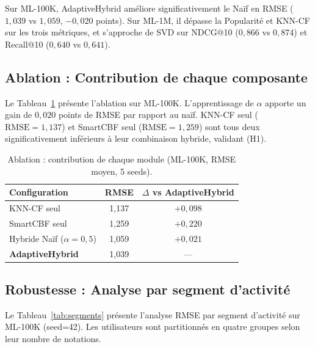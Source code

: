 \documentclass[conference]{IEEEtran}
\begin{document}
Sur ML-100K, AdaptiveHybrid améliore significativement le Naïf en RMSE
($1{,}039$ vs $1{,}059$, $-0{,}020$ points). Sur ML-1M, il dépasse la
Popularité et KNN-CF sur les trois métriques, et s'approche de SVD sur
NDCG@10 ($0{,}866$ vs $0{,}874$) et Recall@10 ($0{,}640$ vs $0{,}641$).

\subsection{Ablation : Contribution de chaque composante}

Le Tableau~\ref{tab:ablation} présente l'ablation sur ML-100K. L'apprentissage
de $\alpha$ apporte un gain de $0{,}020$ points de RMSE par rapport au naïf.
KNN-CF seul ($\text{RMSE}=1{,}137$) et SmartCBF seul ($\text{RMSE}=1{,}259$)
sont tous deux significativement inférieurs à leur combinaison hybride, validant
(H1).

\begin{table}[!t]
\renewcommand{\arraystretch}{1.2}
\caption{Ablation : contribution de chaque module (ML-100K, RMSE moyen, 5 seeds).}
\label{tab:ablation}
\centering
\begin{tabular}{@{}lcc@{}}
\toprule
\textbf{Configuration} & \textbf{RMSE} & \textbf{$\Delta$ vs AdaptiveHybrid} \\
\midrule
KNN-CF seul              & 1,137 & $+0{,}098$ \\
SmartCBF seul            & 1,259 & $+0{,}220$ \\
Hybride Naïf ($\alpha=0{,}5$) & 1,059 & $+0{,}021$ \\
\textbf{AdaptiveHybrid}  & 1,039 & --- \\
\bottomrule
\end{tabular}
\end{table}

\subsection{Robustesse : Analyse par segment d'activité}

Le Tableau~\ref{tab:segments} présente l'analyse RMSE par segment d'activité
sur ML-100K (seed=42). Les utilisateurs sont partitionnés en quatre groupes
selon leur nombre de notations.
\end{document}
